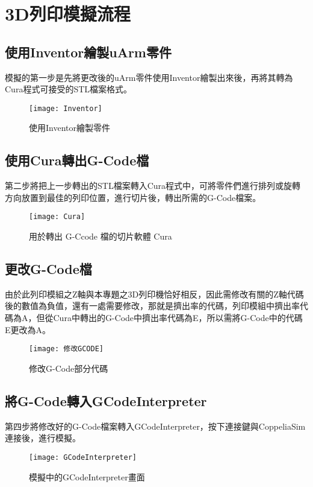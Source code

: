 \chapter{3D列印模擬流程}
\section{使用Inventor繪製uArm零件}
 模擬的第一步是先將更改後的uArm零件使用Inventor繪製出來後，再將其轉為Cura程式可接受的STL檔案格式。\\
\begin{figure}[hbt!]
\begin{center}
\texttt{[image: Inventor]}
\caption{\Large 使用Inventor繪製零件}\label{Inventor}
\end{center}
\end{figure}
\section{使用Cura轉出G-Code檔}
 第二步將把上一步轉出的STL檔案轉入Cura程式中，可將零件們進行排列或旋轉方向放置到最佳的列印位置，進行切片後，轉出所需的G-Code檔案。\\
\begin{figure}[hbt!]
\begin{center}
\texttt{[image: Cura]}
\caption{\Large 用於轉出 G-Ccode 檔的切片軟體 Cura}\label{Cura}
\end{center}
\end{figure}
\section{更改G-Code檔}
 由於此列印模組之Z軸與本專題之3D列印機恰好相反，因此需修改有關的Z軸代碼後的數值為負值，還有一處需要修改，那就是擠出率的代碼，列印模組中擠出率代碼為A，但從Cura中轉出的G-Code中擠出率代碼為E，所以需將G-Code中的代碼E更改為A。
\begin{figure}[hbt!]
\begin{center}
\texttt{[image: 修改GCODE]}
\caption{\Large 修改G-Code部分代碼}\label{修改GCODE}
\end{center}
\end{figure}
\section{將G-Code轉入GCodeInterpreter}
 第四步將修改好的G-Code檔案轉入GCodeInterpreter，按下連接鍵與CoppeliaSim連接後，進行模擬。\\
\begin{figure}[hbt!]
\begin{center}
\texttt{[image: GCodeInterpreter]}
\caption{\Large 模擬中的GCodeInterpreter畫面}\label{GCodeInterpreter}
\end{center}
\end{figure}

